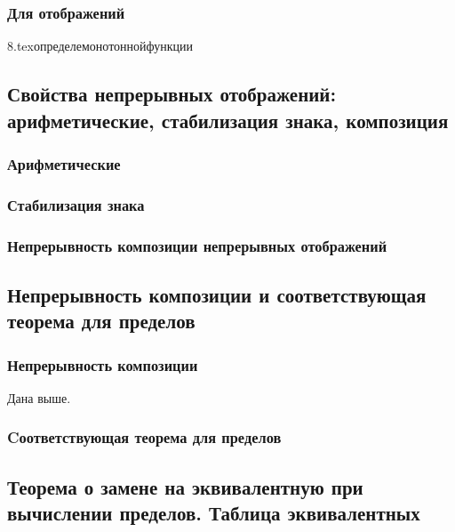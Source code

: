 \subsubsection{Для отображений}

{8.tex}{определемонотоннойфункции}

\subsection{Свойства непрерывных отображений: арифметические, стабилизация знака, композиция}
\subsubsection{Арифметические}
\subsubsection{Стабилизация знака}
\subsubsection{Непрерывность композиции непрерывных отображений}

\subsection{Непрерывность композиции и соответствующая теорема для пределов}
\subsubsection{Непрерывность композиции}
Дана выше.
\subsubsection{Cоответствующая теорема для пределов}

\subsection{Теорема о замене на эквивалентную при вычислении пределов. Таблица эквивалентных}
